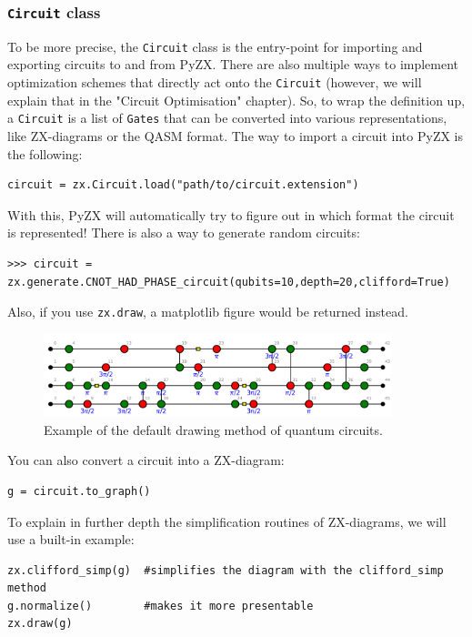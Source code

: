 \subsubsection{\texttt{Circuit} class}
To be more precise, the \texttt{Circuit} class is the entry-point for importing and exporting circuits to and from PyZX. There are also multiple ways to implement optimization schemes that directly act onto the \texttt{Circuit} (however, we will explain that in the "Circuit Optimisation" chapter). So, to wrap the definition up, a \texttt{Circuit} is a list of \texttt{Gates} that can be converted into various representations, like ZX-diagrams or the QASM format. The way to import a circuit into PyZX is the following:
\begin{verbatim}
circuit = zx.Circuit.load("path/to/circuit.extension")
\end{verbatim}

With this, PyZX will automatically try to figure out in which format the circuit is represented! There is also a way to generate random circuits:
\begin{verbatim}
>>> circuit = zx.generate.CNOT_HAD_PHASE_circuit(qubits=10,depth=20,clifford=True)
\end{verbatim}

Also, if you use \texttt{zx.draw}, a matplotlib figure would be returned instead. 

\begin{figure}[H]
        \centering
        \includegraphics[width = 0.9\textwidth]{Figures/examplepyzx.png}
        \caption{Example of the default drawing method of quantum circuits.}
        \label{fig:diagram-ex}
    \end{figure}

You can also convert a circuit into a ZX-diagram:
\begin{verbatim}
g = circuit.to_graph()
\end{verbatim}

To explain in further depth the simplification routines of ZX-diagrams, we will use a built-in example:
\begin{verbatim}
zx.clifford_simp(g)  #simplifies the diagram with the clifford_simp method
g.normalize()        #makes it more presentable
zx.draw(g)
\end{verbatim}

